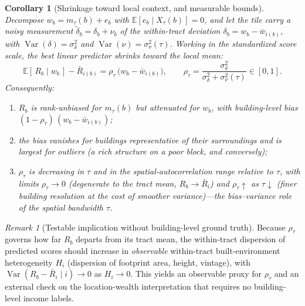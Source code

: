 \documentclass[11pt]{article}
\theoremstyle{plain}
\newtheorem{corollary}{Corollary}
\theoremstyle{remark}
\newtheorem{remark}{Remark}
\newcommand{\E}{\mathbb{E}}
\newcommand{\Var}{\operatorname{Var}}
\newcommand{\Xt}{X_\tau}
\begin{document}
\begin{corollary}[Shrinkage toward local context, and measurable bounds]\label{c:shrink}
Decompose $w_b = m_\tau(b)+e_b$ with $\E[e_b\mid\Xt(b)]=0$, and let the tile carry a
noisy measurement $\tilde\delta_b=\delta_b+\nu_b$ of the within-tract deviation
$\delta_b=w_b-\bar w_{i(b)}$, with $\Var(\delta)=\sigma_\delta^2$ and
$\Var(\nu)=\sigma_\nu^2(\tau)$. Working in the standardized score scale, the
best linear predictor shrinks toward the local mean:
\begin{equation}
\E[\,R_b\mid w_b\,]-\bar R_{i(b)}
=\rho_\tau\,\big(w_b-\bar w_{i(b)}\big),
\qquad
\rho_\tau=\frac{\sigma_\delta^2}{\sigma_\delta^2+\sigma_\nu^2(\tau)}\in[0,1].
\end{equation}
Consequently:
\begin{enumerate}
\itemsep0.1em
\item[(i)] $R_b$ is rank-unbiased for $m_\tau(b)$ but \emph{attenuated} for $w_b$,
with building-level bias $(1-\rho_\tau)\,(w_b-\bar w_{i(b)})$;
\item[(ii)] the bias vanishes for buildings representative of their surroundings and is
largest for outliers (a rich structure on a poor block, and conversely);
\item[(iii)] $\rho_\tau$ is decreasing in $\tau$ and in the spatial-autocorrelation
range relative to $\tau$, with limits $\rho_\tau\to 0$ (degenerate to the tract mean,
$R_b\to\bar R_{i}$) and $\rho_\tau\uparrow$ as $\tau\downarrow$ (finer building
resolution at the cost of smoother variance)---the bias--variance role of the spatial
bandwidth $\tau$.
\end{enumerate}
\end{corollary}

\begin{remark}[Testable implication without building-level ground truth]\label{r:test}
Because $\rho_\tau$ governs how far $R_b$ departs from its tract mean, the within-tract
dispersion of predicted scores should increase in \emph{observable} within-tract
built-environment heterogeneity $H_i$ (dispersion of footprint area, height, vintage),
with $\Var(R_b-\bar R_{i}\mid i)\to 0$ as $H_i\to 0$. This yields an observable proxy
for $\rho_\tau$ and an external check on the location-wealth interpretation that
requires no building-level income labels.
\end{remark}
\end{document}
